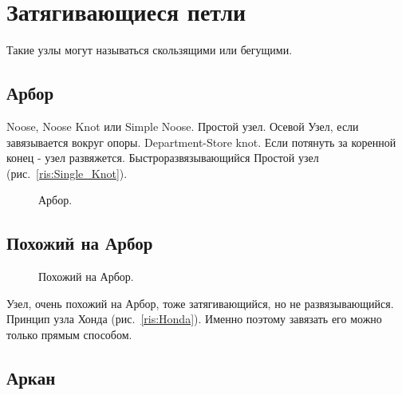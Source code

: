 \section{Затягивающиеся петли}

Такие узлы могут называться скользящими или бегущими.

\subsection{Арбор}

Noose, Noose Knot или Simple Noose. Простой узел. Осевой Узел, если завязывается вокруг опоры. Department-Store knot. Если потянуть за коренной конец - узел развяжется. Быстроразвязывающийся Простой узел (рис.~\ref{ris:Single_Knot}).

\begin{figure}[H]\centering
	\subfloat[Завязывание]{\label{ris:Arbor_1}
	\tcbox[enhanced jigsaw,colframe=black,opacityframe=0.5,opacityback=0.5]
		{\centering
			}
		}
\end{figure}
\begin{figure}[H]\centering
	\subfloat[Результат]{\label{ris:Arbor_2}
	\tcbox[enhanced jigsaw,colframe=black,opacityframe=0.5,opacityback=0.5]
		{\centering
			}
		}
	\caption{Арбор.}\label{ris:Arbor}
\end{figure}

\subsection{Похожий на Арбор}

\begin{figure}[H]\centering
	\begin{minipage}{1\linewidth}
		\begin{center}
			\tcbox[enhanced jigsaw,colframe=black,opacityframe=0.5,opacityback=0.5]
			{\centering{}}
		\end{center}
	\end{minipage}
\caption{Похожий на Арбор.}
\label{ris:Arbor_seems}
\end{figure}

Узел, очень похожий на Арбор, тоже затягивающийся, но не развязывающийся. Принцип узла Хонда (рис.~\ref{ris:Honda}). Именно поэтому завязать его можно только прямым способом.

\subsection{Аркан}

